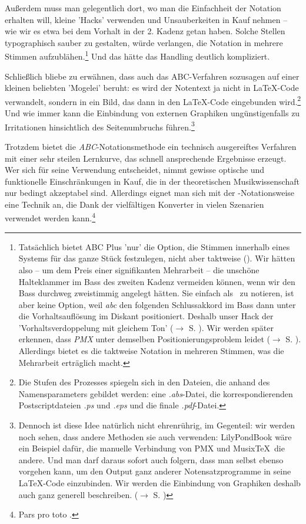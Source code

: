 Außerdem muss man gelegentlich dort, wo man die Einfachheit der Notation
erhalten will, kleine 'Hacks' verwenden und Unsauberkeiten in Kauf nehmen -- wie
wir es etwa bei dem Vorhalt in der 2. Kadenz getan haben. Solche Stellen
typographisch sauber zu gestalten, würde verlangen, die Notation in mehrere
Stimmen aufzublähen.\footnote{Tatsächlich bietet ABC Plus 'nur' die Option, die
Stimmen innerhalb eines Systems für das ganze Stück festzulegen, nicht aber
taktweise (\cite[vgl.][49f]{Gonzato2018b}). Wir hätten also -- um dem Preis einer
signifikanten Mehrarbeit -- die unschöne Halteklammer im Bass des zweiten Kadenz
vermeiden können, wenn wir den Bass durchweg zweistimmig angelegt hätten. Sie
einfach als \Halb\ zu notieren, ist aber keine Option, weil \textit{abc} den
folgenden Schlussakkord im Bass dann unter die Vorhaltsauflösung im Diskant
positioniert. Deshalb unser Hack der 'Vorhaltsverdoppelung mit gleichem Ton'
($\rightarrow$ S. ). Wir werden später erkennen, dass
\textit{PMX} unter demselben Positionierungsproblem leidet ($\rightarrow$ S.
). Allerdings bietet es die taktweise Notation in
mehreren Stimmen, was die Mehrarbeit erträglich macht.
} Und das hätte das Handling deutlich kompliziert.

Schließlich bliebe zu erwähnen, dass auch das ABC-Verfahren sozusagen auf einer
kleinen beliebten 'Mogelei' beruht: es wird der Notentext ja nicht in
\LaTeX-Code verwandelt, sondern in ein Bild, das dann in den \LaTeX-Code
eingebunden wird.\footnote{Die Stufen des Prozesses spiegeln sich in den Dateien,
die anhand des Namensparameters gebildet werden: eine \textit{.abs}-Datei, die
korrespondierenden Postscriptdateien \textit{.ps} und \textit{.eps} und die
finale \textit{.pdf}-Datei.} Und wie immer kann die Einbindung von externen
Graphiken ungünstigenfalls zu Irritationen hinsichtlich des Seitenumbruchs
führen.\footnote{Dennoch ist diese Idee natürlich nicht ehrenrührig, im
Gegenteil: wir werden noch sehen, dass andere Methoden sie auch verwenden:
LilyPondBook wäre ein Beispiel dafür, die manuelle Verbindung von PMX und
Musix\TeX\ die andere. Und man darf daraus sofort auch folgern, dass man selbst
ebenso vorgehen kann, um den Output ganz anderer Notensatzprogramme in seine
\LaTeX-Code einzubinden. Wir werden die Einbindung von Graphiken deshalb auch
ganz generell beschreiben.
($\rightarrow$ S. \pageref{IncludeGraphics})}\label{AbcGraphics}

Trotzdem bietet die \textit{ABC}-Notationsmethode ein technisch ausgereiftes
Verfahren mit einer sehr steilen Lernkurve, das schnell ansprechende Ergebnisse
erzeugt. Wer sich für seine Verwendung entscheidet, nimmt gewisse optische und
funktionelle Einschränkungen in Kauf, die in der theoretischen Musikwissenschaft
nur bedingt akzeptabel sind. Allerdings eignet man sich mit der
-Notationsweise eine Technik an, die Dank der vielfältigen Konverter in
vielen Szenarien verwendet werden kann.\footnote{Pars pro toto
\cite[vgl.][\nopage wp.]{Rosen2018a}.}
% 
